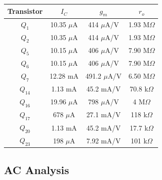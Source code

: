 \documentclass{article}
\begin{document}
	\begin{table}[!ht]
		\centering
		\begin{tabular}{|c|c|c|c|}
			\hline
			Transistor & $I_C$ & $g_m$ & $r_o$\\
			\hline\hline
			$Q_1$ & 10.35 $\mu$A & 414 $\mu$A/V & 1.93 M$\Omega$\\
			\hline
			$Q_2$ & 10.35 $\mu$A & 414 $\mu$A/V & 1.93 M$\Omega$\\
			\hline			
			$Q_5$ & 10.15 $\mu$A & 406 $\mu$A/V & 7.90 M$\Omega$\\
			\hline				
			$Q_6$ & 10.15 $\mu$A & 406 $\mu$A/V & 7.90 M$\Omega$\\
			\hline
			$Q_7$ & 12.28 mA & 491.2 $\mu$A/V & 6.50 M$\Omega$\\
			\hline	
			$Q_{14}$ & 1.13 mA & 45.2 mA/V & 70.8 k$\Omega$\\
			\hline
			$Q_{16}$ & 19.96 $\mu$A & 798 $\mu$A/V & 4 M$\Omega$\\
			\hline			
			$Q_{17}$ & 678 $\mu$A & 27.1 mA/V & 118 k$\Omega$\\
			\hline
			$Q_{20}$ & 1.13 mA & 45.2 mA/V & 17.7 k$\Omega$\\
			\hline
			$Q_{23}$ & 198 $\mu$A & 7.92 mA/V & 101 k$\Omega$\\
			\hline			
		\end{tabular}
		\label{t:2}
	\end{table}
	
	\pagebreak
	\subsection{AC Analysis}
\end{document}
